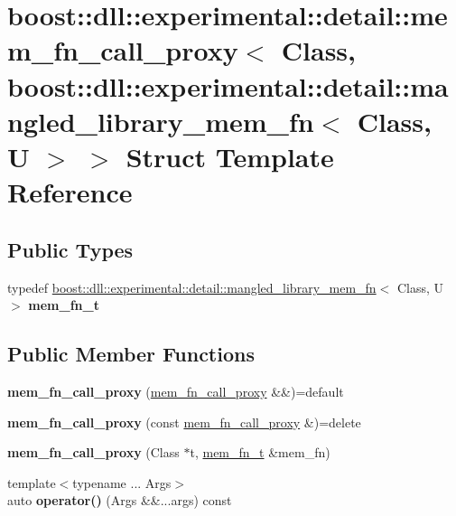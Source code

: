 \hypertarget{a01656}{}\section{boost\+:\+:dll\+:\+:experimental\+:\+:detail\+:\+:mem\+\_\+fn\+\_\+call\+\_\+proxy$<$ Class, boost\+:\+:dll\+:\+:experimental\+:\+:detail\+:\+:mangled\+\_\+library\+\_\+mem\+\_\+fn$<$ Class, U $>$ $>$ Struct Template Reference}
\label{a01656}
\subsection*{Public Types}
\begin{DoxyCompactItemize}
\item 
\mbox{\label{a01656_ae3f81d15bc0e86d8cde5656ddd2a8b9f}} 
typedef \hyperlink{a01672}{boost\+::dll\+::experimental\+::detail\+::mangled\+\_\+library\+\_\+mem\+\_\+fn}$<$ Class, U $>$ {\bfseries mem\+\_\+fn\+\_\+t}
\end{DoxyCompactItemize}
\subsection*{Public Member Functions}
\begin{DoxyCompactItemize}
\item 
\mbox{\label{a01656_a69b3b0f027714af4cc8bcb23fcb9338b}} 
{\bfseries mem\+\_\+fn\+\_\+call\+\_\+proxy} (\hyperlink{a01652}{mem\+\_\+fn\+\_\+call\+\_\+proxy} \&\&)=default
\item 
\mbox{\label{a01656_a43f5678e22e26416850031a516a06730}} 
{\bfseries mem\+\_\+fn\+\_\+call\+\_\+proxy} (const \hyperlink{a01652}{mem\+\_\+fn\+\_\+call\+\_\+proxy} \&)=delete
\item 
\mbox{\label{a01656_a8f79c39b6fcc86bd5ca6e12b998c708a}} 
{\bfseries mem\+\_\+fn\+\_\+call\+\_\+proxy} (Class $\ast$t, \hyperlink{a01672}{mem\+\_\+fn\+\_\+t} \&mem\+\_\+fn)
\item 
\mbox{\label{a01656_ac06b40cf7cc473e6bf75d6eb1db43387}} 
{\footnotesize template$<$typename ... Args$>$ }\\auto {\bfseries operator()} (Args \&\&...args) const
\end{DoxyCompactItemize}
